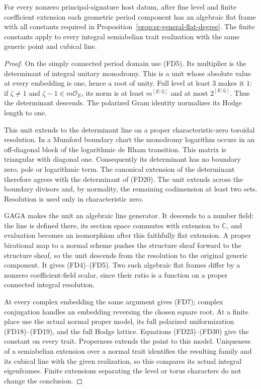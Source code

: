 \begin{srproposition}
\label{prop:sr-actual-adelic-flat-frame}
For every nonzero principal-signature host datum, after
fine level and finite coefficient extension each geometric
period component has an algebraic flat frame with all
constants required in Proposition~\ref{prop:sr-general-flat-degree}.
The finite constants apply to every integral semiabelian
trait realization with the same generic point and cubical line.
\end{srproposition}
\begin{proof}
On the simply connected period domain use (FD5).
Its multiplier is the determinant of integral unitary
monodromy.  This is a unit whose absolute value at every
embedding is one, hence a root of unity.
Full level at least \(3\) makes it \(1\):
if \(\zeta\ne1\) and \(\zeta-1\in m\mathcal O_E\),
its norm is at least \(m^{[E:\mathbb Q]}\) and at most
\(2^{[E:\mathbb Q]}\).
Thus the determinant descends.
The polarized Gram identity normalizes its Hodge length to one.

This unit extends to the determinant line on a proper
characteristic-zero toroidal resolution.
In a Mumford boundary chart the monodromy logarithm occurs
in an off-diagonal block of the logarithmic de Rham transition.
This matrix is triangular with diagonal one.
Consequently its determinant has no boundary zero, pole or
logarithmic term.
The canonical extension of the determinant therefore agrees
with the determinant of (FD20).
The unit extends across the boundary divisors and, by normality,
the remaining codimension at least two sets.
Resolution is used only in characteristic zero.

GAGA makes the unit an algebraic line generator.
It descends to a number field: the line is defined there,
its section space commutes with extension to \(\mathbb C\),
and evaluation becomes an isomorphism after this faithfully
flat extension.
A proper birational map to a normal scheme pushes the
structure sheaf forward to the structure sheaf, so the
unit descends from the resolution to the original generic
component.  It gives (FD4)--(FD5).
Two such algebraic flat frames differ by a nonzero
coefficient-field scalar, since their ratio is a function
on a proper connected integral resolution.

At every complex embedding the same argument gives (FD7);
complex conjugation handles an embedding reversing the
chosen square root.
At a finite place use the actual normal proper model,
its full polarized uniformization (FD18)--(FD19), and
the full Hodge lattice.
Equations (FD23)--(FD30) give the constant on every trait.
Properness extends the point to this model.
Uniqueness of a semiabelian extension over a normal trait
identifies the resulting family and its cubical line
with the given realization, so this compares its actual
integral eigenframes.
Finite extensions separating the level or torus characters
do not change the conclusion.


\end{proof}
